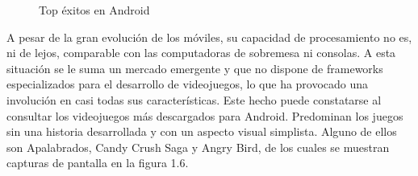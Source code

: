\begin{figure}[h]
	\centerfloat	 
	\caption{Top éxitos en Android}
\end{figure}

A pesar de la gran evolución de los móviles, su capacidad de procesamiento no es, ni de lejos, comparable con las computadoras de sobremesa ni consolas. A esta situación se le suma un mercado emergente y que no dispone de frameworks especializados para el desarrollo de videojuegos, lo que ha provocado una involución en casi todas sus características.
Este hecho puede constatarse al consultar los videojuegos más descargados para Android. Predominan los juegos sin una historia desarrollada y con un aspecto visual simplista. Alguno de ellos son Apalabrados, Candy Crush Saga y Angry Bird, de los cuales se muestran capturas de pantalla en la figura 1.6.
\newline

